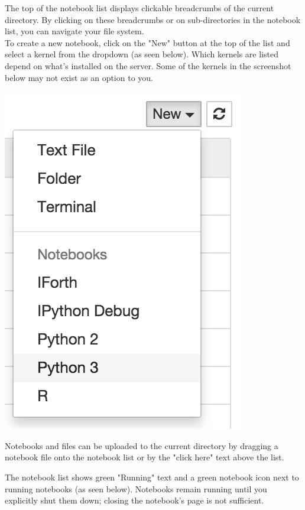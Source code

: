 The top of the notebook list displays clickable breadcrumbs of the current directory. By clicking on these breadcrumbs or on sub-directories in the notebook list, you can navigate your file system.\\

To create a new notebook, click on the "New" button at the top of the list and select a kernel from the dropdown (as seen below). Which kernels are listed depend on what's installed on the server. Some of the kernels in the screenshot below may not exist as an option to you.

\begin{marginfigure}
    \centering
    \includegraphics[]{dashboard_files_tab_new.png}
\end{marginfigure}

Notebooks and files can be uploaded to the current directory by dragging a notebook file onto the notebook list or by the "click here" text above the list.

The notebook list shows green "Running" text and a green notebook icon next to running notebooks (as seen below). Notebooks remain running until you explicitly shut them down; closing the notebook's page is not sufficient.

